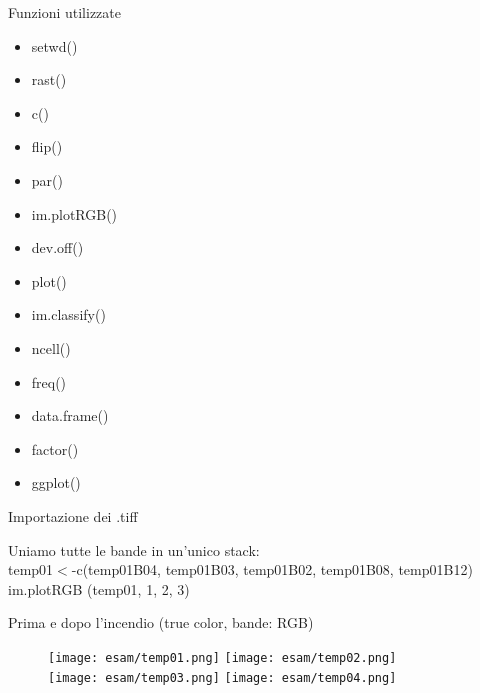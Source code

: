 \documentclass{beamer} %
\begin{document}
        \begin{frame}{Funzioni utilizzate}
            \begin{multicols}{2}
                    \begin{itemize}
                        \item setwd() 
                        \item rast() 
                        \item c()
                        \item flip()
                        \item par() 
                        \item im.plotRGB()
                        \item dev.off()
                \columnbreak
                        \item plot()
                        \item im.classify()
                        \item ncell()
                        \item freq()
                        \item data.frame()
                        \item factor()
                        \item ggplot()
                    \end{itemize}
                \end{multicols}
        \end{frame}

        \begin{frame}{Importazione dei .tiff}
            
            Uniamo tutte le bande in un'unico stack:\\
            {\scriptsize temp01\(<\)-c(temp01B04, temp01B03, temp01B02, temp01B08, temp01B12)}\\
            {\scriptsize im.plotRGB (temp01, 1, 2, 3)}
        \end{frame}

        \begin{frame}{Prima e dopo l'incendio (true color, bande: RGB)}
            \begin{figure}
                \centering
                \texttt{[image: esam/temp01.png]}
                \texttt{[image: esam/temp02.png]} \\
                \texttt{[image: esam/temp03.png]}
                \texttt{[image: esam/temp04.png]} \\
            \end{figure}
        \end{frame}
\end{document}
